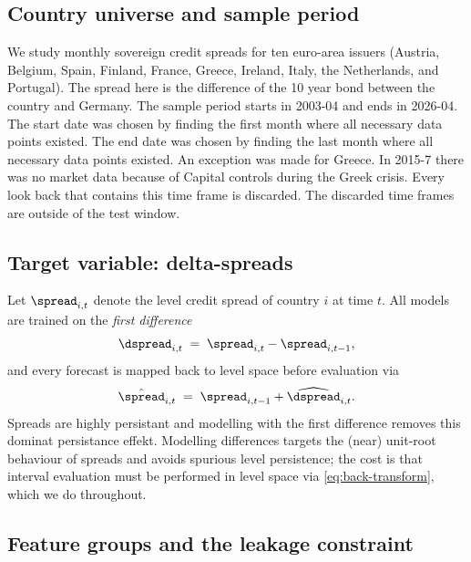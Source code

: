\subsection{Country universe and sample period}
\label{sec:data:universe}

We study monthly sovereign credit spreads for ten euro-area issuers
(Austria, Belgium, Spain, Finland, France, Greece, Ireland, Italy, the
Netherlands, and Portugal).
The spread here is the difference of the 10 year bond between the country
and Germany. The sample period starts in 2003-04 and ends in 2026-04. The
start date was chosen by finding the first month where all necessary data
points existed. The end date was chosen by finding the last month where all
necessary data points existed. An exception was made for Greece. In 2015-7 there was no market data because of Capital controls during the Greek crisis. Every look back that contains this time frame is discarded. The discarded time frames are outside of the test window.

\subsection{Target variable: delta-spreads}
\label{sec:data:target}

Let $\spread_{i,t}$ denote the level credit spread of country $i$ at time
$t$. All models are trained on the \emph{first difference}
\begin{equation}
  \dspread_{i,t} \;=\; \spread_{i,t} - \spread_{i,t-1},
  \label{eq:delta-target}
\end{equation}
and every forecast is mapped back to level space before evaluation via
\begin{equation}
  \hat{\spread}_{i,t} \;=\; \spread_{i,t-1} + \widehat{\dspread}_{i,t}.
  \label{eq:back-transform}
\end{equation}
Spreads are highly persistant and modelling with the first difference removes this dominat persistance effekt.
Modelling differences targets the (near) unit-root behaviour of spreads and
avoids spurious level persistence; the cost is that interval evaluation must
be performed in level space via \cref{eq:back-transform}, which we do
throughout.

\subsection{Feature groups and the leakage constraint}
\label{sec:data:features}

